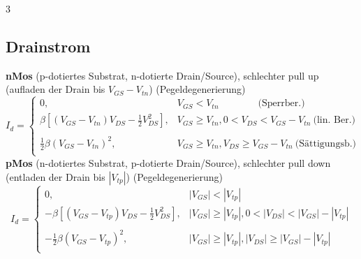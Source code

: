 \documentclass[6pt,a4paper]{scrartcl}
\begin{document}
\begin{multicols*}{3}
\begin{minipage}{\columnwidth}
		\subsection{Drainstrom}
		\textbf{nMos} (p-dotiertes Substrat, n-dotierte Drain/Source), schlechter pull up (aufladen der Drain bis $V_{GS} - V_{tn}$) (Pegeldegenerierung)
		\begin{equation*}
			\!\!\! I_d = \begin{cases}
				0,                                                        & V_{GS} < V_{tn} \qquad \qquad  \text{(Sperrber.)}                      \\[0.2em]
				\beta [(V_{GS} - V_{tn}) V_{DS} - \frac{1}{2} V_{DS}^2] , & V_{GS} \ge V_{tn}, 0 < V_{DS} < V_{GS} - V_{tn} \  \text{(lin. Ber.)}  \\\\[0.2em]
				\frac{1}{2} \beta (V_{GS} - V_{tn})^2,                    & V_{GS} \ge V_{tn}, V_{DS} \ge V_{GS} - V_{tn} \  \text{(Sättigungsb.)} \\
			\end{cases}
		\end{equation*}
		\textbf{pMos} (n-dotiertes Substrat, p-dotierte Drain/Source), schlechter pull down (entladen der Drain bis $|V_{tp}|$) (Pegeldegenerierung)
		\begin{equation*}
			\!\!\! I_d = \begin{cases}
				0,                                                          & |V_{GS}| < |V_{tp}|                                       \\[0.2em]
				- \beta [(V_{GS} - V_{tp}) V_{DS} - \frac{1}{2} V_{DS}^2] , & |V_{GS}| \ge |V_{tp}|, 0 < |V_{DS}| < |V_{GS}| - |V_{tp}| \\\\[0.2em]
				- \frac{1}{2} \beta (V_{GS} - V_{tp})^2,                    & |V_{GS}| \ge |V_{tp}|, |V_{DS}| \ge |V_{GS}|-|V_{tp}|     \\
			\end{cases}
		\end{equation*}
	\end{minipage}


\end{multicols*}
\end{document}
